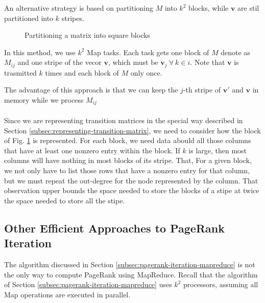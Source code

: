 An alternative strategy is based on partitioning $M$ into $k^2$ blocks, while $\textbf{v}$ are stil partitioned into $k$ stripes.

\begin{figure}[H]
\centering
\scalebox{1}{
    
}
\caption{Partitioning a matrix into square blocks}
\label{fig:partitioned-matrix}
\end{figure}

In this method, we use $k^2$ Map tasks. Each task gets one block of $M$ denote as $M_{ij}$ and one stripe of the vecor $\textbf{v}$, which must be $\textbf{v}_j \ \forall \ k \in  i$. Note that $\textbf{v}$ is trasmitted $k$ times and each block of $M$ only once.

The advantage of this approach is that we can keep the $j$-th stripe of $\textbf{v}'$ and $\textbf{v}$ in memory while we process $M_{ij}$\\
\\
Since we are representing transition matrices in the special way described in Section \ref{subsec:representing-transition-matrix}, we need to consider how the block of Fig. \ref{fig:partitioned-matrix} is represented. For each block, we need data abould all those columns that have at least one nonzero entry within the block. If $k$ is large, then most columns will have nothing in most blocks of its stripe. That, For a given block, we not only have to list those rows that have a nonzero entry for that column, but we must repeat the out-degree for the node represented by the column. That observation upper bounds the space needed to store the blocks of a stipe at twice the space needed to store all the stipe. 

\subsection{Other Efficient Approaches to PageRank Iteration}\label{subsec:other-efficient-approaches-pagerank-iteration}

The algorithm discussed in Section \ref{subsec:pagerank-iteration-mapreduce} is not the only way to compute PageRank using MapReduce. Recall that the algorithm of Section \ref{subsec:pagerank-iteration-mapreduce} uses $k^2$ processors, assuming all Map operations are executed in parallel.
